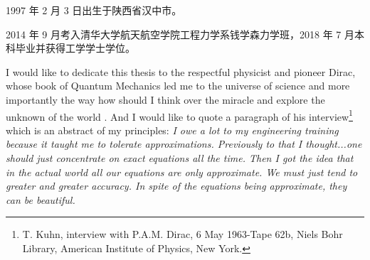 


1997 年 2 月 3 日出生于陕西省汉中市。

2014 年 9 月考入清华大学航天航空学院工程力学系钱学森力学班，2018 年 7 月本科毕业并获得工学学士学位。





  

\researchitem{} 

I would like to dedicate this thesis to the respectful physicist and pioneer Dirac, whose book of Quantum Mechanics led me to the universe of science and more importantly the way how should I think over the miracle and explore the unknown of the world  . And I would like to quote a paragraph of his interview\footnote{T. Kuhn, interview with P.A.M. Dirac, 6 May 1963-Tape 62b, Niels Bohr Library, American Institute of Physics, New York.} which is an abstract of my principles:
\textit{I owe a lot to my engineering training because it taught me to tolerate approximations. Previously to that I thought...one should just concentrate on exact equations all the time. Then I got the idea that in the actual world all our equations are only approximate. We must just tend to greater and greater accuracy. In spite of the equations being approximate, they can be beautiful.}



